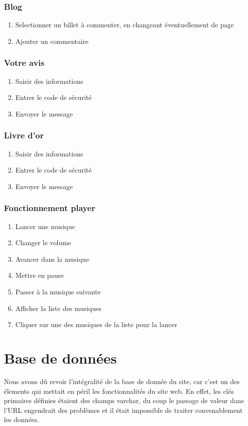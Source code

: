 \documentclass[11pt]{report}
\begin{document}
\subsubsection{Blog}
\begin{enumerate}
\item Selectionner un billet à commenter, en changeant éventuellement de page
\item Ajouter un commentaire
\end{enumerate}
\subsubsection{Votre avis}
\begin{enumerate}
\item Saisir des informations 
\item Entrer le code de sécurité
\item Envoyer le message
\end{enumerate}
\subsubsection{Livre d’or}
\begin{enumerate}
\item Saisir des informations 
\item Entrer le code de sécurité
\item Envoyer le message
\end{enumerate}

\subsubsection{Fonctionnement player}
\begin{enumerate}
 \item Lancer une musique
 \item Changer le volume
\item Avancer dans la musique
\item Mettre en pause
\item Passer à la musique suivante
\item Afficher la liste des musiques
\item Cliquer sur une des musiques de la liste pour la lancer
 
\end{enumerate}



\section{Base de données}
Nous avons dû revoir l'intégralité de la base de donnée du site, car c'est un
des élements qui mettait en péril les fonctionnalités du site web. En effet, les
clés primaires définies étaient des champs varchar, du coup le passage de valeur
dans l'URL engendrait des problèmes et il était impossible de traiter
convenablement les données. \\
\end{document}
